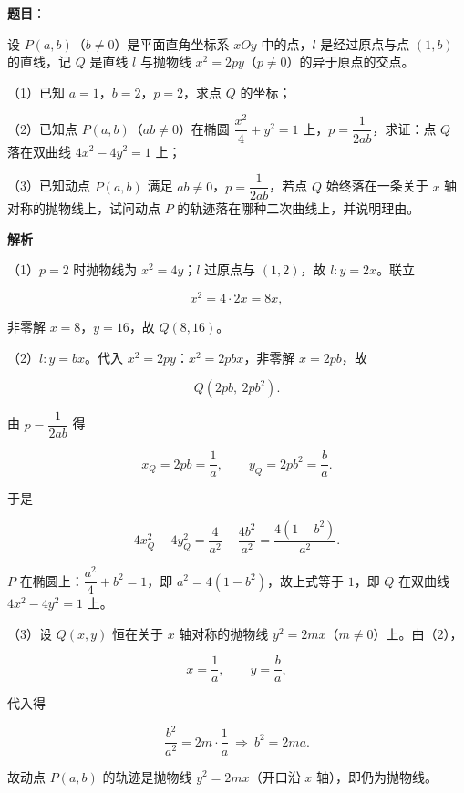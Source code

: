 \begin{answer}

\textbf{题目}：

设 $P(a,b)$（$b\neq0$）是平面直角坐标系 $xOy$ 中的点，$l$ 是经过原点与点 $(1,b)$ 的直线，记 $Q$ 是直线 $l$ 与抛物线 $x^2=2py$（$p\neq0$）的异于原点的交点。

（1）已知 $a=1$，$b=2$，$p=2$，求点 $Q$ 的坐标；

（2）已知点 $P(a,b)$（$ab\neq0$）在椭圆 $\dfrac{x^2}4+y^2=1$ 上，$p=\dfrac1{2ab}$，求证：点 $Q$ 落在双曲线 $4x^2-4y^2=1$ 上；

（3）已知动点 $P(a,b)$ 满足 $ab\neq0$，$p=\dfrac1{2ab}$，若点 $Q$ 始终落在一条关于 $x$ 轴对称的抛物线上，试问动点 $P$ 的轨迹落在哪种二次曲线上，并说明理由。

\textbf{解析}

（1）$p=2$ 时抛物线为 $x^2=4y$；$l$ 过原点与 $(1,2)$，故 $l:y=2x$。联立

\nopagebreak[4]
\[x^2=4\cdot2x=8x,\]

非零解 $x=8$，$y=16$，故 $Q(8,16)$。

（2）$l:y=bx$。代入 $x^2=2py$：$x^2=2pbx$，非零解 $x=2pb$，故

\nopagebreak[4]
\[Q\left(2pb,\ 2pb^2\right).\]

由 $p=\dfrac1{2ab}$ 得

\nopagebreak[4]
\[x_Q=2pb=\frac1a,\qquad y_Q=2pb^2=\frac ba.\]

于是

\nopagebreak[4]
\[4x_Q^2-4y_Q^2=\frac{4}{a^2}-\frac{4b^2}{a^2}=\frac{4(1-b^2)}{a^2}.\]

$P$ 在椭圆上：$\dfrac{a^2}4+b^2=1$，即 $a^2=4(1-b^2)$，故上式等于 $1$，即 $Q$ 在双曲线 $4x^2-4y^2=1$ 上。

（3）设 $Q(x,y)$ 恒在关于 $x$ 轴对称的抛物线 $y^2=2mx$（$m\neq0$）上。由（2），

\nopagebreak[4]
\[x=\frac1a,\qquad y=\frac ba,\]

代入得

\nopagebreak[4]
\[\frac{b^2}{a^2}=2m\cdot\frac1a\ \Longrightarrow\ b^2=2ma.\]

故动点 $P(a,b)$ 的轨迹是抛物线 $y^2=2mx$（开口沿 $x$ 轴），即仍为抛物线。


\end{answer}

